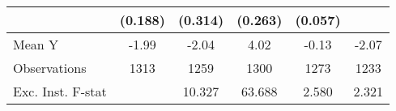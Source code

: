 {\begin{tabular}{l*{5}{c}}
            &     (0.188)         &     (0.314)         &     (0.263)         &     (0.057)         &                     \\
\midrule
Mean Y      &       -1.99         &       -2.04         &        4.02         &       -0.13         &       -2.07         \\
Observations&        1313         &        1259         &        1300         &        1273         &        1233         \\
Exc. Inst. F-stat&                     &      10.327         &      63.688         &       2.580         &       2.321         \\
\bottomrule
\end{tabular}
}
